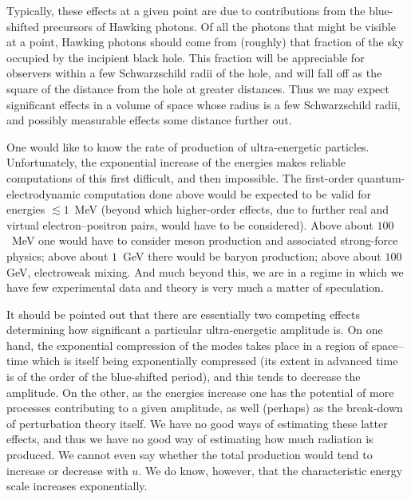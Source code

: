 \documentclass[12pt]{article}
\begin{document}
Typically, these effects at a given point are due to contributions from the
blue-shifted precursors of Hawking photons. Of all the photons that might be
visible at a point, Hawking photons should come from (roughly) that fraction of
the sky occupied by the incipient black hole.   This fraction will be
appreciable for observers within a few Schwarzschild radii of the hole, and
will fall off as the square of the distance from the hole at greater
distances.  Thus we may expect significant effects in a volume of space whose
radius is a few Schwarzschild radii, and possibly measurable effects some
distance further out.

One would like to know the rate of production of ultra-energetic particles.
Unfortunately, the exponential increase of the energies makes reliable
computations of this first difficult, and then impossible.  The first-order
quantum-electrodynamic computation done above would be expected to be valid for
energies $\lesssim 1$~MeV (beyond which higher-order effects, due to  further
real and virtual electron--positron pairs, would have to be considered).  Above
about $100$~MeV one would have to consider meson production and associated
strong-force physics; above about $1$~GeV there would be baryon production;
above about $100$ GeV, electroweak mixing.
And much beyond this, we are in a regime in which we have few experimental data
and theory is very much a matter of speculation.  

It should be pointed out that there are essentially two competing effects
determining how significant a particular ultra-energetic amplitude is.  On one
hand, the exponential compression of the modes takes place in a region of
space--time which is itself being exponentially compressed (its extent in
advanced time is of the order of the blue-shifted period), and this tends to
decrease the amplitude.  On the other, as the energies increase one has the
potential of more processes contributing to a given amplitude, as well (perhaps)
as the break-down of perturbation theory itself.  We have no good ways of
estimating these latter effects, and thus we have no good way of estimating how
much radiation is produced.  We cannot even say whether the total production
would tend to increase or decrease with $u$.  We do know, however, that the
characteristic energy scale increases exponentially.
\end{document}
